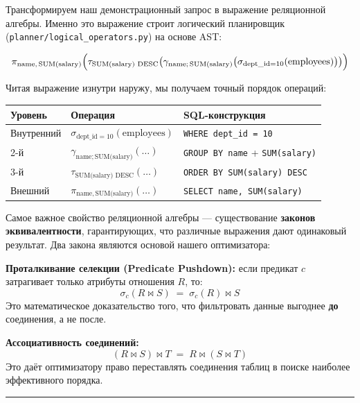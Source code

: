 \documentclass[a4paper,12pt]{report}
\begin{document}
{Трансформируем наш демонстрационный запрос в выражение реляционной алгебры. Именно это выражение строит логический планировщик (\texttt{planner/logical\_operators.py}) на основе AST:

\begin{equation*}
\pi_{\text{name},\, \text{SUM(salary)}} \Bigl( \tau_{\text{SUM(salary) DESC}} \bigl( \gamma_{\text{name};\, \text{SUM(salary)}} \bigl( \sigma_{\text{dept\_id} = 10}(\text{employees}) \bigr) \bigr) \Bigr)
\end{equation*}

Читая выражение изнутри наружу, мы получаем точный порядок операций:

\begin{longtable}{|l|l|l|}
\hline
Уровень & Операция & SQL-конструкция \\ \hline
Внутренний & $\sigma_{\text{dept\_id}=10}(\text{employees})$ & \texttt{WHERE dept\_id = 10} \\ \hline
2-й & $\gamma_{\text{name};\, \text{SUM(salary)}}(\ldots)$ & \texttt{GROUP BY name} + \texttt{SUM(salary)} \\ \hline
3-й & $\tau_{\text{SUM(salary) DESC}}(\ldots)$ & \texttt{ORDER BY SUM(salary) DESC} \\ \hline
Внешний & $\pi_{\text{name},\, \text{SUM(salary)}}(\ldots)$ & \texttt{SELECT name, SUM(salary)} \\ \hline
\end{longtable}

Самое важное свойство реляционной алгебры — существование \textbf{законов эквивалентности}, гарантирующих, что различные выражения дают одинаковый результат. Два закона являются основой нашего оптимизатора:

\textbf{Проталкивание селекции (Predicate Pushdown):} если предикат $c$ затрагивает только атрибуты отношения $R$, то:
\begin{equation*}
\sigma_c(R \bowtie S) \;=\; \sigma_c(R) \bowtie S
\end{equation*}
Это математическое доказательство того, что фильтровать данные выгоднее \textbf{до} соединения, а не после.

\textbf{Ассоциативность соединений:}
\begin{equation*}
(R \bowtie S) \bowtie T \;=\; R \bowtie (S \bowtie T)
\end{equation*}
Это даёт оптимизатору право переставлять соединения таблиц в поиске наиболее эффективного порядка.

\vspace{0.5cm}\hrule\vspace{0.5cm}

}
\end{document}
